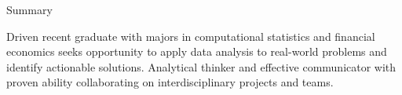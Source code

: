 \begin{rSection}{Summary}

Driven recent graduate with majors in computational statistics and financial economics seeks opportunity to apply data analysis to real-world problems and identify actionable solutions. Analytical thinker and effective communicator with proven ability collaborating on interdisciplinary projects and teams.



\end{rSection}

